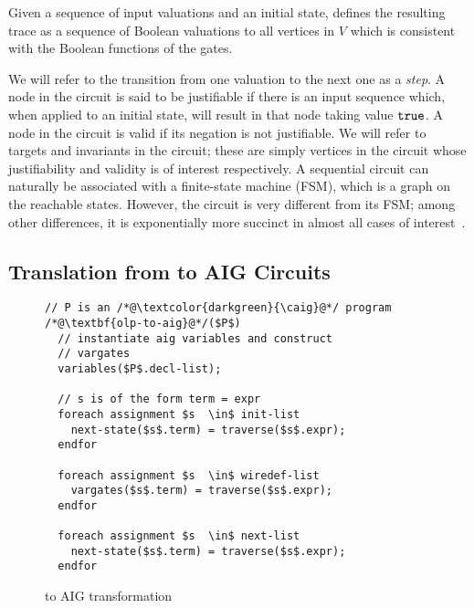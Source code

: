 Given a sequence of input valuations and an initial state, 
 defines the resulting trace as a 
sequence of Boolean valuations to all vertices in $V$
which is consistent with the Boolean functions of the
gates. 


We will refer to the transition from one valuation
to the next one as a {\em step}.  A node in the circuit is
said to be justifiable if there is an input sequence which, when
applied to an initial state, will result in that node
taking value $\mathtt{true}$.  A node in the circuit is
valid if its negation is not justifiable.  We will refer
to targets and invariants in the circuit; these are simply
vertices in the circuit whose justifiability and validity
is of interest respectively.
A sequential circuit can naturally
be associated with a finite-state machine (FSM),
which is a graph on the reachable states.  However, the 
circuit is very different from its FSM; among
other differences, it is exponentially more succinct in
almost all cases of interest~\cite{BuClMcDiHw92}. 
%
%
\subsection{Translation from \caig to AIG Circuits}
%

\begin{figure}
\begin{lstlisting}
// P is an /*@\textcolor{darkgreen}{\caig}@*/ program
/*@\textbf{olp-to-aig}@*/($P$) 
  // instantiate aig variables and construct
  // vargates
  variables($P$.decl-list); 
  
  // s is of the form term = expr 
  foreach assignment $s  \in$ init-list 
    next-state($s$.term) = traverse($s$.expr);  
  endfor
  
  foreach assignment $s  \in$ wiredef-list
    vargates($s$.term) = traverse($s$.expr);  
  endfor
  
  foreach assignment $s  \in$ next-list
    next-state($s$.term) = traverse($s$.expr);  
  endfor
\end{lstlisting}
\caption{\caig to AIG transformation }
\label{fig:olp2aig}
\end{figure}

